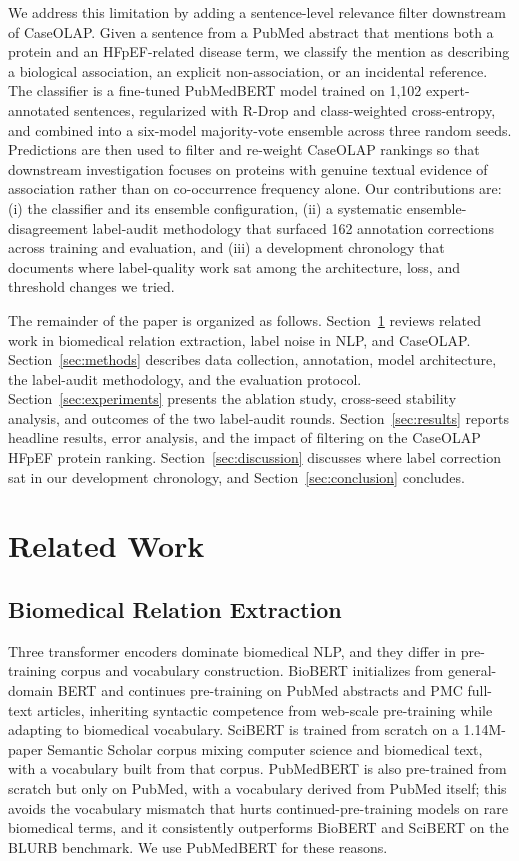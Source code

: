\documentclass[sn-basic,pdflatex]{sn-jnl}
\begin{document}
We address this limitation by adding a sentence-level relevance filter downstream of CaseOLAP. Given a sentence from a PubMed abstract that mentions both a protein and an HFpEF-related disease term, we classify the mention as describing a biological association, an explicit non-association, or an incidental reference. The classifier is a fine-tuned PubMedBERT model trained on 1{,}102 expert-annotated sentences, regularized with R-Drop and class-weighted cross-entropy, and combined into a six-model majority-vote ensemble across three random seeds. Predictions are then used to filter and re-weight CaseOLAP rankings so that downstream investigation focuses on proteins with genuine textual evidence of association rather than on co-occurrence frequency alone. Our contributions are: (i) the classifier and its ensemble configuration, (ii) a systematic ensemble-disagreement label-audit methodology that surfaced 162 annotation corrections across training and evaluation, and (iii) a development chronology that documents where label-quality work sat among the architecture, loss, and threshold changes we tried.

The remainder of the paper is organized as follows. Section~\ref{sec:related} reviews related work in biomedical relation extraction, label noise in NLP, and CaseOLAP. Section~\ref{sec:methods} describes data collection, annotation, model architecture, the label-audit methodology, and the evaluation protocol. Section~\ref{sec:experiments} presents the ablation study, cross-seed stability analysis, and outcomes of the two label-audit rounds. Section~\ref{sec:results} reports headline results, error analysis, and the impact of filtering on the CaseOLAP HFpEF protein ranking. Section~\ref{sec:discussion} discusses where label correction sat in our development chronology, and Section~\ref{sec:conclusion} concludes.


\section{Related Work}
\label{sec:related}

\subsection{Biomedical Relation Extraction}

Three transformer encoders dominate biomedical NLP, and they differ in pre-training corpus and vocabulary construction. BioBERT \citep{lee2020biobert} initializes from general-domain BERT \citep{devlin2019bert} and continues pre-training on PubMed abstracts and PMC full-text articles, inheriting syntactic competence from web-scale pre-training while adapting to biomedical vocabulary. SciBERT \citep{beltagy2019scibert} is trained from scratch on a 1.14M-paper Semantic Scholar corpus mixing computer science and biomedical text, with a vocabulary built from that corpus. PubMedBERT \citep{gu2021pubmedbert} is also pre-trained from scratch but only on PubMed, with a vocabulary derived from PubMed itself; this avoids the vocabulary mismatch that hurts continued-pre-training models on rare biomedical terms, and it consistently outperforms BioBERT and SciBERT on the BLURB benchmark. We use PubMedBERT for these reasons.
\end{document}
